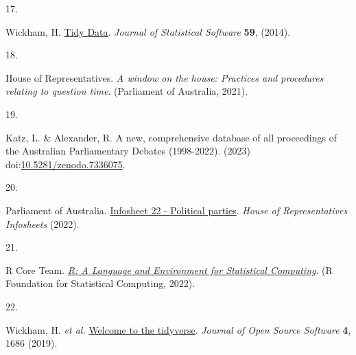 \documentclass[
  letterpaper,
  DIV=11,
  numbers=noendperiod]{scrartcl}
\newlength{\cslhangindent}
\newlength{\csllabelwidth}
\newlength{\cslentryspacingunit} %
\newenvironment{CSLReferences}[2] %
 {%
  \setlength{\parindent}{0pt}
  \ifodd #1
  \let\oldpar\par
  \def\par{\hangindent=\cslhangindent\oldpar}
  \fi
  \setlength{\parskip}{#2\cslentryspacingunit}
 }%
 {}
\newcommand{\CSLLeftMargin}[1]{\parbox[t]{\csllabelwidth}{#1}}
\newcommand{\CSLRightInline}[1]{\parbox[t]{\linewidth - \csllabelwidth}{#1}\break}
\begin{document}
\begin{CSLReferences}{0}{0}
\leavevmode{}%
\CSLLeftMargin{17. }%
\CSLRightInline{Wickham, H.
\href{https://doi.org/10.18637/jss.v059.i10}{{Tidy Data}}. \emph{Journal
of Statistical Software} \textbf{59}, (2014).}

\leavevmode{}%
\CSLLeftMargin{18. }%
\CSLRightInline{House of Representatives. \emph{{A window on the house:
Practices and procedures relating to question time}}. ({Parliament of
Australia}, 2021).}

\leavevmode{}%
\CSLLeftMargin{19. }%
\CSLRightInline{Katz, L. \& Alexander, R. {A new, comprehensive database
of all proceedings of the Australian Parliamentary Debates (1998-2022)}.
(2023)
doi:\href{https://doi.org/10.5281/zenodo.7336075}{10.5281/zenodo.7336075}.}

\leavevmode{}%
\CSLLeftMargin{20. }%
\CSLRightInline{Parliament of Australia.
\href{https://www.aph.gov.au/About_Parliament/House_of_Representatives/Powers_practice_and_procedure/00_-_Infosheets/Infosheet_22_-_Political_parties}{{Infosheet
22 - Political parties}}. \emph{House of Representatives Infosheets}
(2022).}

\leavevmode{}%
\CSLLeftMargin{21. }%
\CSLRightInline{R Core Team. \emph{\href{https://www.R-project.org/}{{R:
A Language and Environment for Statistical Computing}}}. (R Foundation
for Statistical Computing, 2022).}

\leavevmode{}%
\CSLLeftMargin{22. }%
\CSLRightInline{Wickham, H. \emph{et al.}
\href{https://doi.org/10.21105/joss.01686}{{Welcome to the tidyverse}}.
\emph{Journal of Open Source Software} \textbf{4}, 1686 (2019).}

\end{CSLReferences}
\end{document}
